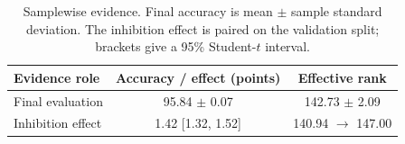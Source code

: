 \begin{table}[H]
\centering
\small
\caption{Samplewise \TeReL{} evidence. Final accuracy is mean $\pm$ sample standard deviation. The inhibition effect is paired on the validation split; brackets give a 95\% Student-$t$ interval.}
\label{tab:residual-state-primary}
\begin{tabular}{lcc}
\toprule
Evidence role & Accuracy / effect (points) & Effective rank \\
\midrule
Final evaluation & 95.84 $\pm$ 0.07 & 142.73 $\pm$ 2.09 \\
Inhibition effect & 1.42 [1.32, 1.52] & 140.94 $\rightarrow$ 147.00 \\
\bottomrule
\end{tabular}
\end{table}
